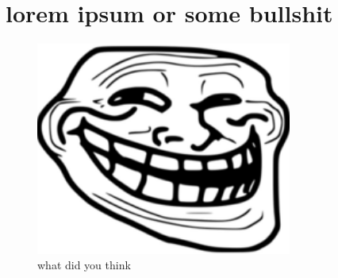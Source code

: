 \documentclass[12pt, a4paper]{article}
\theoremstyle{definition}
\begin{document}
\section{lorem ipsum or some bullshit}
\begin{figure}[t]
    \centering
    \includegraphics[width=0.75\textwidth]{shitpost.png}
    \caption{what did you think}
    \label{fig:trollface}
\end{figure}
\end{document}
